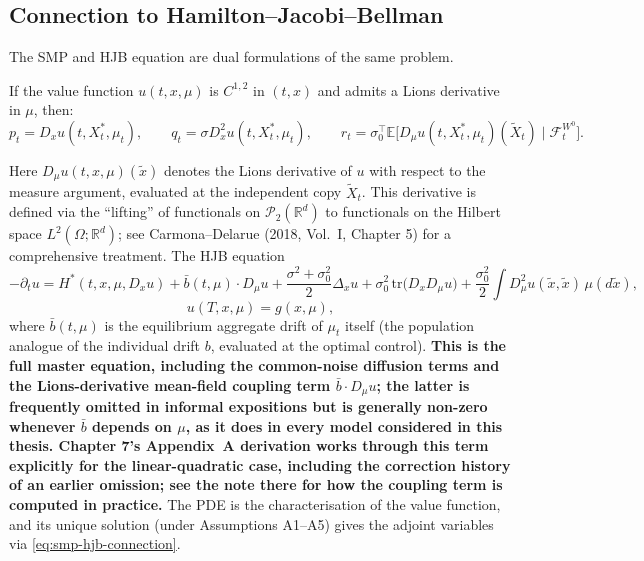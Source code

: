 \subsection{Connection to Hamilton--Jacobi--Bellman}

The SMP and HJB equation are dual formulations of the same problem.

\begin{theorem}
\label{thm:smp-hjb}
If the value function $u(t,x,\mu)$ is $C^{1,2}$ in $(t,x)$ and admits a Lions
derivative in $\mu$, then:
\begin{equation}
    p_t = D_x u(t, X_t^*, \mu_t), \qquad q_t = \sigma D_x^2 u(t, X_t^*, \mu_t), \qquad
    r_t = \sigma_0^\top \mathbb{E}\big[ D_\mu u(t, X_t^*, \mu_t)(\widetilde{X}_t) \mid
    \mathcal{F}_t^{W^0} \big].
    \label{eq:smp-hjb-connection}
\end{equation}
\end{theorem}

Here $D_\mu u(t,x,\mu)(\widetilde{x})$ denotes the Lions derivative of $u$ with respect
to the measure argument, evaluated at the independent copy $\widetilde{X}_t$. This
derivative is defined via the ``lifting'' of functionals on $\mathcal{P}_2(\mathbb{R}^d)$
to functionals on the Hilbert space $L^2(\Omega; \mathbb{R}^d)$; see
Carmona--Delarue (2018, Vol.\ I, Chapter 5) for a comprehensive treatment. The HJB
equation
\[
    -\partial_t u = H^*(t,x,\mu,D_x u) + \bar{b}(t,\mu)\cdot D_\mu u
    + \frac{\sigma^2+\sigma_0^2}{2}\Delta_x u + \sigma_0^2 \,\mathrm{tr}\big(D_x D_\mu
    u\big) + \frac{\sigma_0^2}{2}\int D_\mu^2 u(\widetilde{x},\widetilde{x})\,
    \mu(d\widetilde{x}),
\]
\[
    u(T,x,\mu) = g(x,\mu),
\]
where $\bar{b}(t,\mu)$ is the equilibrium aggregate drift of $\mu_t$ itself (the
population analogue of the individual drift $b$, evaluated at the optimal control).
\textbf{This is the full master equation, including the common-noise diffusion terms
and the Lions-derivative mean-field coupling term $\bar{b}\cdot D_\mu u$; the latter
is frequently omitted in informal expositions but is generally non-zero whenever
$\bar{b}$ depends on $\mu$, as it does in every model considered in this thesis.
Chapter 7's Appendix~A derivation works through this term explicitly for the
linear-quadratic case, including the correction history of an earlier omission;
see the note there for how the coupling term is computed in practice.} The PDE
is the characterisation of the value function, and its unique solution (under
Assumptions A1--A5) gives the adjoint variables via \eqref{eq:smp-hjb-connection}.

